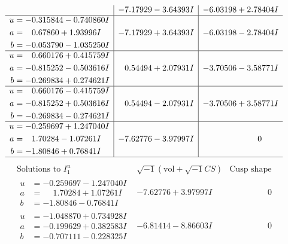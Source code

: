 \documentclass[1p]{elsarticle_modified}
\theoremstyle{definition}
\newcommand{\I}{\sqrt{-1}}
\begin{document}
$$\begin{array}{c|c|c}
 & -7.17929 - 3.64393 I & -6.03198 + 2.78404 I \\ \hline\begin{aligned}
u &= -0.315844 - 0.740860 I \\
a &= \phantom{-}0.67860 + 1.93996 I \\
b &= -0.053790 - 1.035250 I\end{aligned}
 & -7.17929 + 3.64393 I & -6.03198 - 2.78404 I \\ \hline\begin{aligned}
u &= \phantom{-}0.660176 + 0.415759 I \\
a &= -0.815252 - 0.503616 I \\
b &= -0.269834 + 0.274621 I\end{aligned}
 & \phantom{-}0.54494 + 2.07931 I & -3.70506 - 3.58771 I \\ \hline\begin{aligned}
u &= \phantom{-}0.660176 - 0.415759 I \\
a &= -0.815252 + 0.503616 I \\
b &= -0.269834 - 0.274621 I\end{aligned}
 & \phantom{-}0.54494 - 2.07931 I & -3.70506 + 3.58771 I \\ \hline\begin{aligned}
u &= -0.259697 + 1.247040 I \\
a &= \phantom{-}1.70284 - 1.07261 I \\
b &= -1.80846 + 0.76841 I\end{aligned}
 & -7.62776 - 3.97997 I & \phantom{-0.000000 } 0\\
 \hline 
 \end{array}$$\newpage$$\begin{array}{c|c|c}  
\text{Solutions to }I^u_{1}& \I (\text{vol} + \sqrt{-1}CS) & \text{Cusp shape}\\
 \hline 
\begin{aligned}
u &= -0.259697 - 1.247040 I \\
a &= \phantom{-}1.70284 + 1.07261 I \\
b &= -1.80846 - 0.76841 I\end{aligned}
 & -7.62776 + 3.97997 I & \phantom{-0.000000 } 0 \\ \hline\begin{aligned}
u &= -1.048870 + 0.734928 I \\
a &= -0.199629 + 0.382583 I \\
b &= -0.707111 - 0.228325 I\end{aligned}
 & -6.81414 - 8.86603 I & \phantom{-0.000000 } 0 \\ \hline\begin{aligned}

\end{aligned}
\end{array}$$
\end{document}
